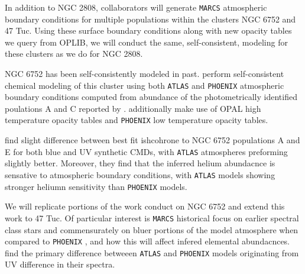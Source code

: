 In addition to NGC 2808, collaborators will generate \texttt{MARCS} atmospheric
boundary conditions for multiple populations within the clusters NGC 6752 and
47 Tuc. Using these surface boundary conditions along with new opacity tables
we query from OPLIB, we will conduct the same, self-consistent, modeling for
these clusters as we do for NGC 2808.

NGC 6752 has been self-consistently modeled in past. \citet{Dotter2015} perform
self-consistent chemical modeling of this cluster using both \texttt{ATLAS} and
\texttt{PHOENIX} atmospheric boundary conditions computed from abundance of the
photometrically identified poulations A and C reported by \citet{Milone2013}.
\citeauthor{Dotter2015} additionally make use of OPAL high temperature opacity
tables and \texttt{PHOENIX} low temperature opacity tables.  

\citeauthor{Dotter2015} find slight difference between best fit ishcohrone to
NGC 6752 populations A and E for both blue and UV synthetic CMDs, with
\texttt{ATLAS} atmospheres preforming slightly better. Moreover, they find that
the inferred helium abundacnce is sensative to atmospheric boundary conditions,
with \texttt{ATLAS} models showing stronger heliumn sensitivity than
\texttt{PHOENIX} models.

We will replicate portions of the work \citeauthor{Dotter2015} conduct on NGC
6752 and extend this work to 47 Tuc. Of particular interest is \texttt{MARCS}
historical focus on earlier spectral class stars and commensurately on bluer
portions of the model atmosphere when compared to \texttt{PHOENIX}
\citep{Plez2011}, and how this will affect infered elemental abundacnces.
\citeauthor{Dotter2015} find the primary difference betweeen \texttt{ATLAS} and
\texttt{PHOENIX} models originating from UV difference in their spectra.
